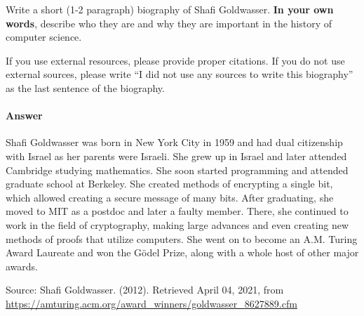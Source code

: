 \documentclass{article}
\begin{document}

Write a short (1-2 paragraph) biography of Shafi Goldwasser.
\textbf{In your own words}, describe who they are and why they are important in
the history of computer science.

If you use external resources, please provide
proper citations. If you do not use external sources, please write ``I did not
use any sources to write this biography'' as the last sentence of the
biography.

\paragraph{Answer}

Shafi Goldwasser was born in New York City in 1959 and had dual citizenship with Israel as her parents were Israeli. She grew up in Israel and later attended Cambridge studying mathematics. She soon started programming and attended graduate school at Berkeley. She created methods of encrypting a single bit, which allowed creating a secure message of many bits. After graduating, she moved to MIT as a postdoc and later a faulty member. There, she continued to work in the field of cryptography, making large advances and even creating new methods of proofs that utilize computers. She went on to become an A.M. Turing Award Laureate and won the Gödel Prize, along with a whole host of other major awards.

Source: Shafi Goldwasser. (2012). Retrieved April 04, 2021, from \url{https://amturing.acm.org/award_winners/goldwasser_8627889.cfm}

% 
% 
\end{document}
